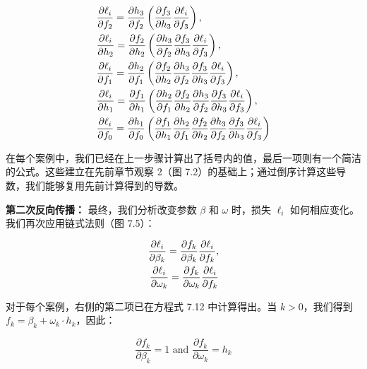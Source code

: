 \documentclass[lang=cn,newtx,10pt,scheme=chinese]{elegantbook}
\begin{document}
\begin{align}
&\frac{\partial \ell_i}{\partial f_2} = \frac{\partial h_3}{\partial f_2} \left( \frac{\partial f_3}{\partial h_3} \frac{\partial \ell_i}{\partial f_3} \right), \notag \\
&\frac{\partial \ell_i}{\partial h_2} = \frac{\partial f_2}{\partial h_2} \left( \frac{\partial h_3}{\partial f_2} \frac{\partial f_3}{\partial h_3} \frac{\partial \ell_i}{\partial f_3} \right), \notag \\
&\frac{\partial \ell_i}{\partial f_1} = \frac{\partial h_2}{\partial f_1} \left( \frac{\partial f_2}{\partial h_2} \frac{\partial h_3}{\partial f_2} \frac{\partial f_3}{\partial h_3} \frac{\partial \ell_i}{\partial f_3} \right), \notag \\
&\frac{\partial \ell_i}{\partial h_1} = \frac{\partial f_1}{\partial h_1} \left( \frac{\partial h_2}{\partial f_1} \frac{\partial f_2}{\partial h_2} \frac{\partial h_3}{\partial f_2} \frac{\partial f_3}{\partial h_3} \frac{\partial \ell_i}{\partial f_3} \right), \notag \\
&\frac{\partial \ell_i}{\partial f_0} = \frac{\partial h_1}{\partial f_0} \left( \frac{\partial f_1}{\partial h_1} \frac{\partial h_2}{\partial f_1} \frac{\partial f_2}{\partial h_2} \frac{\partial h_3}{\partial f_2} \frac{\partial f_3}{\partial h_3} \frac{\partial \ell_i}{\partial f_3} \right) 
\end{align}

在每个案例中，我们已经在上一步骤计算出了括号内的值，最后一项则有一个简洁的公式。这些建立在先前章节观察 2（图 7.2）的基础上；通过倒序计算这些导数，我们能够复用先前计算得到的导数。


\textbf{第二次反向传播：} 最终，我们分析改变参数 \(\beta\) 和 \(\omega\) 时，损失 \(\ell_i\) 如何相应变化。我们再次应用链式法则（图 7.5）：

\begin{align}
\frac{\partial \ell_i}{\partial \beta_k} = \frac{\partial f_k}{\partial \beta_k} \frac{\partial \ell_i}{\partial f_k}, \notag \\
\frac{\partial \ell_i}{\partial \omega_k} = \frac{\partial f_k}{\partial \omega_k} \frac{\partial \ell_i}{\partial f_k} 
\end{align}

对于每个案例，右侧的第二项已在方程式 7.12 中计算得出。当 \(k > 0\)，我们得到 \(f_k = \beta_k + \omega_k \cdot h_k\)，因此：

\begin{equation}
\frac{\partial f_k}{\partial \beta_k} = 1 \text{ and } \frac{\partial f_k}{\partial \omega_k} = h_k 
\end{equation}
\end{document}
